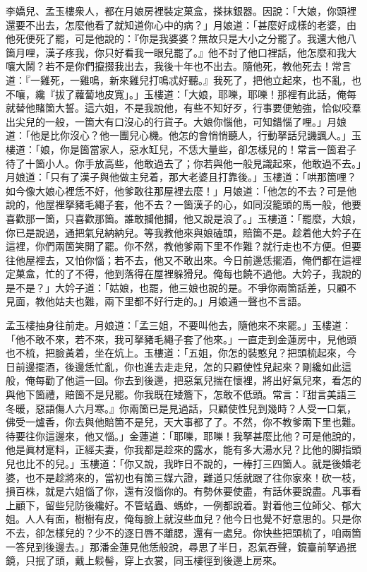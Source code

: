 李嬌兒、孟玉樓衆人，都在月娘房裡裝定菓盒，搽抹銀器。因說：「大娘，你頭裡還要不出去，怎麼他看了就知道你心中的病？」月娘道：「甚麼好成樣的老婆，由他死便死了罷，可是他說的：『你是我婆婆？無故只是大小之分罷了。我還大他八箇月哩，漢子疼我，你只好看我一眼兒罷了。』他不討了他口裡話，他怎麼和我大嚷大鬧？{}若不是你們攛掇我出去，我後十年也不出去。隨他死，教他死去！常言道：『一雞死，一雞鳴，新來雞兒打鳴忒好聽。』{}我死了，把他立起來，也不亂，也不嚷，纔『拔了蘿蔔地皮寬」。」玉樓道：「大娘，耶嚛，耶嚛！那裡有此話，俺每就替他賭箇大誓。這六姐，不是我說他，有些不知好歹，行事要便勉強，恰似咬羣出尖兒的一般，一箇大有口沒心的行貨子。{}大娘你惱他，可知錯惱了哩。」{}月娘道：「他是比你沒心？他一團兒心機。他怎的會悄悄聽人，行動拏話兒譏諷人。」玉樓道：「娘，你是箇當家人，惡水缸兒，不恁大量些，卻怎樣兒的！常言一箇君子待了十箇小人。{}你手放高些，他敢過去了；你若與他一般見識起來，他敢過不去。」月娘道：「只有了漢子與他做主兒着，那大老婆且打靠後。」玉樓道：「哄那箇哩？如今像大娘心裡恁不好，他爹敢往那屋裡去麼！」月娘道：「他怎的不去？可是他說的，他屋裡拏豬毛繩子套，他不去？一箇漢子的心，如同沒籠頭的馬一般，他要喜歡那一箇，只喜歡那箇。誰敢攔他攔，他又說是浪了。」{}玉樓道：「罷麼，大娘，你已是說過，通把氣兒納納兒。等我教他來與娘磕頭，賠箇不是。趁着他大妗子在這裡，你們兩箇笑開了罷。你不然，教他爹兩下里不作難？就行走也不方便。但要往他屋裡去，又怕你惱；若不去，他又不敢出來。今日前邊恁擺酒，俺們都在這裡定菓盒，忙的了不得，他到落得在屋裡躲猾兒。俺每也饒不過他。大妗子，我說的是不是？」大妗子道：「姑娘，也罷，他三娘也說的是。不爭你兩箇話差，只顧不見面，教他姑夫也難，兩下里都不好行走的。」月娘通一聲也不言語。

孟玉樓抽身往前走。{}月娘道：「孟三姐，不要叫他去，隨他來不來罷。」玉樓道：「他不敢不來，若不來，我可拏豬毛繩子套了他來。」{}{}一直走到金蓮房中，見他頭也不梳，把臉黃着，坐在炕上。玉樓道：「五姐，你怎的裝憨兒？把頭梳起來，今日前邊擺酒，後邊恁忙亂，你也進去走走兒，怎的只顧使性兒起來？剛纔如此這般，俺每勸了他這一回。你去到後邊，把惡氣兒揣在懷裡，將出好氣兒來，看怎的與他下箇禮，賠箇不是兒罷。你我既在矮簷下，怎敢不低頭。常言：『甜言美語三冬暖，惡語傷人六月寒。』你兩箇已是見過話，只顧使性兒到幾時？人受一口氣，佛受一爐香，你去與他賠箇不是兒，天大事都了了。不然，你不教爹兩下里也難。待要往你這邊來，他又惱。」{}金蓮道：「耶嚛，耶嚛！我拏甚麼比他？{}可是他說的，他是眞材寔料，正經夫妻，你我都是趁來的露水，能有多大湯水兒？比他的脚指頭兒也比不的兒。」玉樓道：「你又說，我昨日不說的，一棒打三四箇人。就是後婚老婆，也不是趁將來的，當初也有箇三媒六證，難道只恁就跟了往你家來！砍一枝，損百株，就是六姐惱了你，還有沒惱你的。有勢休要使盡，有話休要說盡。凡事看上顧下，留些兒防後纔好。不管蜢蟲、螞蚱，一例都說着。對着他三位師父、郁大姐。人人有面，樹樹有皮，俺每臉上就沒些血兒？他今日也覺不好意思的。只是你不去，卻怎樣兒的？少不的逐日唇不離腮，還有一處兒。你快些把頭梳了，咱兩箇一答兒到後邊去。」那潘金蓮見他恁般說，尋思了半日，忍氣吞聲，{}鏡臺前拏過抿鏡，只抿了頭，戴上鬏髻，穿上衣裳，同玉樓徑到後邊上房來。

